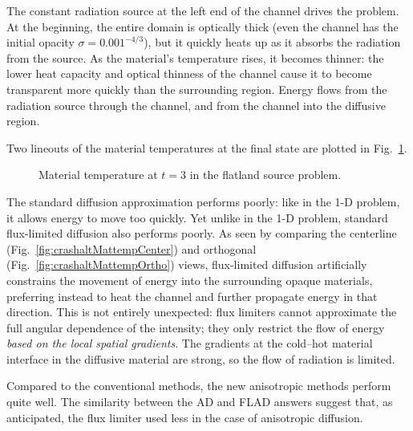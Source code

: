 The constant radiation source at the left end of the channel
drives the problem. At the beginning, the entire domain is optically thick
(even the channel has the initial opacity $\sigma=0.001^{-4/3}$), but it quickly
heats up as it absorbs the radiation from the source. As the material's
temperature rises, it becomes
thinner: the lower heat capacity and optical thinness of the channel cause it to
become transparent more quickly than the surrounding region. Energy flows
from the radiation source through the channel, and from the channel into the
diffusive region.

Two lineouts of the material temperatures at the final state are plotted in
Fig.~\ref{fig:crashaltMattemp}.
%
\begin{figure}[htb]
  \centering\small
  \caption{Material temperature at $t=3$ in the flatland source problem.}
  \label{fig:crashaltMattemp}
\end{figure}
%
The standard diffusion approximation performs
poorly: like in the 1-D problem, it allows energy to move too quickly. Yet
unlike in the 1-D problem, standard flux-limited diffusion also
performs poorly. As seen by comparing the centerline
(Fig.~\ref{fig:crashaltMattempCenter}) and orthogonal
(Fig.~\ref{fig:crashaltMattempOrtho}) views, flux-limited diffusion artificially
constrains the movement of energy into the surrounding opaque materials,
preferring instead to heat the channel and further propagate energy in that
direction. This is not entirely unexpected: flux limiters cannot approximate the
full angular dependence of the intensity; they only restrict the flow of energy
\emph{based on the local spatial gradients}. The gradients at the cold--hot
material interface in the diffusive material are strong, so the flow of
radiation is limited.

Compared to the conventional methods, the new anisotropic methods perform quite
well. The similarity between the AD and FLAD answers suggest that, as
anticipated, the flux limiter used less in the case of anisotropic diffusion.

